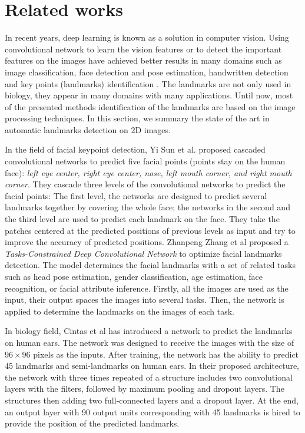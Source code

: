 \documentclass[conference]{IEEEtran}
\begin{document}
\section{Related works}
In recent years, deep learning is known as a solution in computer vision. Using convolutional network to learn the vision features or to detect the important features on the images have achieved better results in many domains such as image classification\cite{krizhevsky2012imagenet}\cite{ciregan2012multi}, face detection and pose estimation\cite{li2015convolutional,lawrence1997face,farfade2015multi,osadchy2007synergistic}, handwritten detection\cite{lecun1990handwritten}\cite{graves2009offline} and key points (landmarks) identification \cite{sun2013deep,zhang2014facial,cintas2016automatic}. The landmarks are not only used in biology, they appear in many domains with many applications. Until now, most of the presented methods identification of the landmarks are based on the image processing techniques\cite{palaniswamy2010automatic}\cite{kaur2015automatic}\cite{le2017maelab}. In this section, we summary the state of the art in automatic landmarks detection on 2D images.

In the field of facial keypoint detection, Yi Sun et al.\cite{sun2013deep} proposed cascaded convolutional networks to predict five facial points (points stay on the human face): \textit{left eye center, right eye center, nose, left mouth corner, and right mouth corner}. They cascade three levels of the convolutional networks to predict the facial points: The first level, the networks are designed to predict several landmarks together by covering the whole face; the networks in the second and the third level are used to predict each landmark on the face. They take the patches centered at the predicted positions of previous levels as input and try to improve the accuracy of predicted positions. Zhanpeng Zhang et al\cite{zhang2014facial} proposed a \textit{Tasks-Constrained Deep Convolutional Network} to optimize facial landmarks detection. The model determines the facial landmarks with a set of related tasks such as head pose estimation, gender classification, age estimation, face recognition, or facial attribute inference. Firstly, all the images are used as the input, their output spaces the images into several tasks. Then, the network is applied to determine the landmarks on the images of each task. 

In biology field, Cintas et al\cite{cintas2016automatic} has introduced a network to predict the landmarks on human ears. The network was designed to receive the images with the size of $96 \times 96$ pixels as the inputs. After training, the network has the ability to predict 45 landmarks and semi-landmarks on human ears. In their proposed architecture, the network with three times repeated of a structure includes two convolutional layers with the filters, followed by maximum pooling and dropout layers. The structures then adding two full-connected layers and a dropout layer. At the end, an output layer with 90 output units corresponding with 45 landmarks is hired to provide the position of the predicted landmarks.
\end{document}
